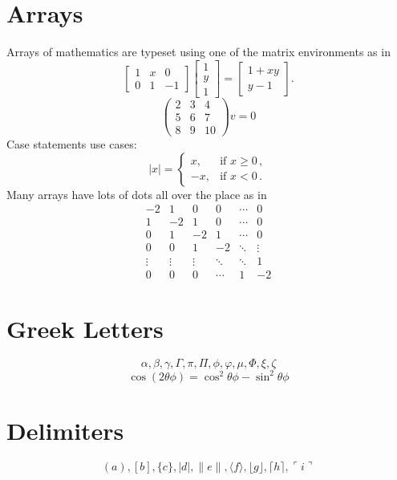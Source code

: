 \section{Arrays}
Arrays of mathematics are typeset using one of the matrix environments as
in
\[
        \begin{bmatrix}
                1 & x & 0 \\
                0 & 1 & -1
        \end{bmatrix}\begin{bmatrix}
                1  \\
                y  \\
                1
        \end{bmatrix}
        =\begin{bmatrix}
                1+xy  \\
                y-1
        \end{bmatrix}.
\]
\[ \begin{pmatrix}
2 & 3 & 4\\
5 & 6 & 7\\
8 & 9 & 10 \end{pmatrix} v = 0 \]
Case statements use cases:
\[
        |x|=\begin{cases}
                x, & \text{if }x\geq 0\,,  \\
                -x, & \text{if }x< 0\,.
        \end{cases}
\]
Many arrays have lots of dots all over the place as in
\[
        \begin{matrix}
                -2 & 1 & 0 & 0 & \cdots & 0  \\
                1 & -2 & 1 & 0 & \cdots & 0  \\
                0 & 1 & -2 & 1 & \cdots & 0  \\
                0 & 0 & 1 & -2 & \ddots & \vdots \\
                \vdots & \vdots & \vdots & \ddots & \ddots & 1  \\
                0 & 0 & 0 & \cdots & 1 & -2
        \end{matrix}
\]
\section{Greek Letters}
\[ \alpha,  \beta,  \gamma, \Gamma, \pi, \Pi, \phi, \varphi, \mu, \Phi, \xi, \zeta \]
\[ \cos(2\theta\phi) = \cos^2 \theta\phi - \sin^2 \theta\phi \]
\section{Delimiters}
\[ ( a ), [ b ], \{ c \}, | d |, \| e \|,
\langle f \rangle, \lfloor g \rfloor,
\lceil h \rceil, \ulcorner i \urcorner \]
